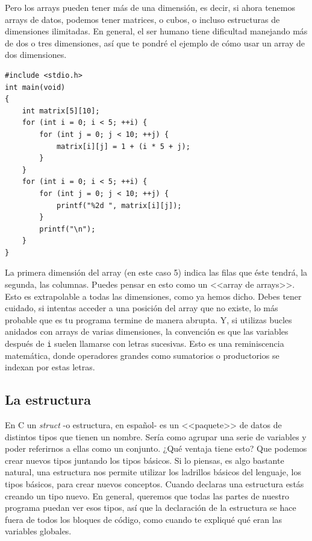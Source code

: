 \documentclass[a4paper]{article}
\begin{document}
Pero los arrays pueden tener más de una dimensión, es decir, si ahora tenemos
arrays de datos, podemos tener matrices, o cubos, o incluso
estructuras de dimensiones ilimitadas. En general, el ser humano tiene
dificultad manejando más de dos o tres dimensiones, así que te pondré el ejemplo
de cómo usar un array de dos dimensiones.


\noindent
\begin{minipage}[H]{\linewidth}
\mbox{}
\begin{lstlisting}[style=C,
caption={Ejemplo de uso de array bidimensional},
label={lst:bidimensionalArray}]
#include <stdio.h>
int main(void)
{
    int matrix[5][10];
    for (int i = 0; i < 5; ++i) {
        for (int j = 0; j < 10; ++j) {
            matrix[i][j] = 1 + (i * 5 + j);
        }
    }
    for (int i = 0; i < 5; ++i) {
        for (int j = 0; j < 10; ++j) {
            printf("%2d ", matrix[i][j]);
        }
        printf("\n");
    }
}
\end{lstlisting}
\end{minipage}


La primera dimensión del array (en este caso 5) indica las filas que éste
tendrá, la segunda, las columnas. Puedes pensar en esto como un <<array de
arrays>>. Esto es extrapolable a todas las dimensiones, como ya hemos dicho.
Debes tener cuidado, si intentas acceder a una posición del array que no existe,
lo más probable que es tu programa termine de manera abrupta. Y, si utilizas
bucles anidados con arrays de varias dimensiones, la convención es que las
variables después de \verb!i! suelen llamarse con letras sucesivas. Esto
es una reminiscencia matemática, donde operadores grandes como sumatorios
o productorios se indexan por estas letras.

\subsection{La estructura}
En C un \textit{struct} -o estructura, en español-
es un <<paquete>> de datos de distintos tipos que
tienen un nombre. Sería como agrupar una serie de variables y poder referirnos
a ellas como un conjunto. ¿Qué ventaja tiene esto? Que podemos crear nuevos
tipos juntando los tipos básicos. Si lo piensas, es algo bastante natural, una
estructura nos permite utilizar los ladrillos básicos del lenguaje, los
tipos básicos, para crear nuevos conceptos.
Cuando declaras una estructura estás creando un tipo
nuevo. En general,
queremos que todas las partes de nuestro programa puedan ver esos tipos, así
que la declaración de la estructura se hace fuera de todos los bloques
de código, como cuando te expliqué qué eran las variables globales.
\end{document}
